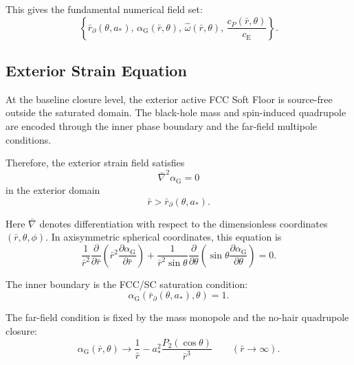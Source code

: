 This gives the fundamental numerical field set:
\begin{equation}
    \boxed{ \left\{ \bar{r}_{\partial}(\theta,a_\ast), \, \alpha_{\mathrm{G}}(\bar{r},\theta), \, \widehat{\omega}(\bar{r},\theta), \, \frac{c_P(\bar{r},\theta)}{c_{\mathrm{E}}} \right\}. }
\end{equation}

\subsection{Exterior Strain Equation}

At the baseline closure level, the exterior active FCC Soft Floor is source-free outside the saturated domain. The black-hole mass and spin-induced quadrupole are encoded through the inner phase boundary and the far-field multipole conditions.

Therefore, the exterior strain field satisfies
\begin{equation}
    \boxed{ \bar{\nabla}^2\alpha_{\mathrm{G}} = 0 }
\end{equation}
in the exterior domain
\begin{equation}
    \bar{r} > \bar{r}_{\partial}(\theta,a_\ast).
\end{equation}

Here $\bar{\nabla}$ denotes differentiation with respect to the dimensionless coordinates $(\bar{r},\theta,\phi)$. In axisymmetric spherical coordinates, this equation is
\begin{equation}
    \frac{1}{\bar{r}^2} \frac{\partial}{\partial \bar{r}} \left( \bar{r}^2 \frac{\partial \alpha_{\mathrm{G}}}{\partial \bar{r}} \right) + \frac{1}{\bar{r}^2\sin\theta} \frac{\partial}{\partial\theta} \left( \sin\theta \frac{\partial \alpha_{\mathrm{G}}}{\partial\theta} \right) = 0.
\end{equation}

The inner boundary is the FCC/SC saturation condition:
\begin{equation}
    \boxed{ \alpha_{\mathrm{G}}(\bar{r}_{\partial}(\theta,a_\ast),\theta) = 1. }
\end{equation}

The far-field condition is fixed by the mass monopole and the no-hair quadrupole closure:
\begin{equation}
    \boxed{ \alpha_{\mathrm{G}}(\bar{r},\theta) \rightarrow \frac{1}{\bar{r}} - a_\ast^2 \frac{P_2(\cos\theta)}{\bar{r}^3} \qquad (\bar{r}\rightarrow\infty). }
\end{equation}


